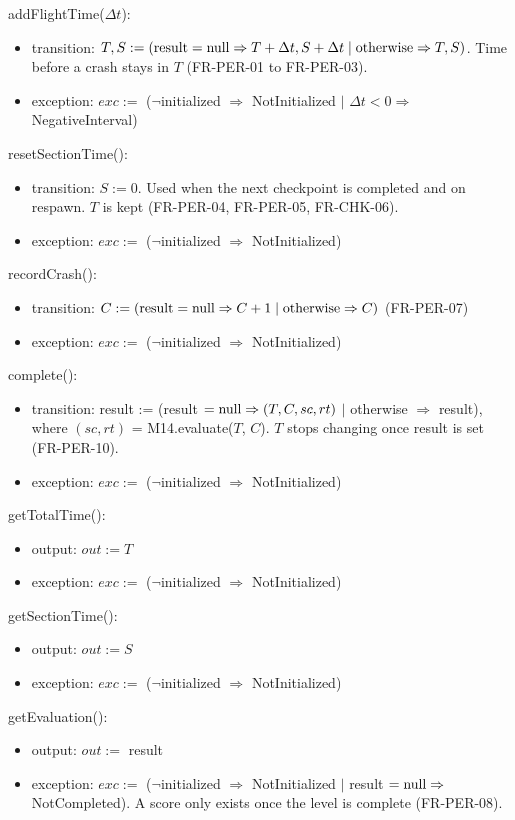 \documentclass[12pt, titlepage]{article}
\newcommand{\nul}{\textnormal{null}}
\newcommand{\noinit}{$\neg$initialized $\Rightarrow$ NotInitialized}
\begin{document}
\noindent addFlightTime($\Delta t$):
\begin{itemize}
\item transition: $T, S := (\text{result} = \nul \Rightarrow T + \Delta t,
  S + \Delta t \;|\; \text{otherwise} \Rightarrow T, S)$. Time before a crash
  stays in $T$ (FR-PER-01 to FR-PER-03).
\item exception: $exc :=$ (\noinit{} $|$ $\Delta t < 0 \Rightarrow$
  NegativeInterval)
\end{itemize}

\noindent resetSectionTime():
\begin{itemize}
\item transition: $S := 0$. Used when the next checkpoint is completed and on
  respawn. $T$ is kept (FR-PER-04, FR-PER-05, FR-CHK-06).
\item exception: $exc :=$ (\noinit)
\end{itemize}

\noindent recordCrash():
\begin{itemize}
\item transition: $C := (\text{result} = \nul \Rightarrow C + 1 \;|\;
  \text{otherwise} \Rightarrow C)$ (FR-PER-07)
\item exception: $exc :=$ (\noinit)
\end{itemize}

\noindent complete():
\begin{itemize}
\item transition: result := (result $= \nul \Rightarrow (T, C, sc, rt)$ $|$
  otherwise $\Rightarrow$ result), where $(sc, rt)$ = M14.evaluate($T$, $C$).
  $T$ stops changing once result is set (FR-PER-10).
\item exception: $exc :=$ (\noinit)
\end{itemize}

\noindent getTotalTime():
\begin{itemize}
\item output: $out := T$
\item exception: $exc :=$ (\noinit)
\end{itemize}

\noindent getSectionTime():
\begin{itemize}
\item output: $out := S$
\item exception: $exc :=$ (\noinit)
\end{itemize}

\noindent getEvaluation():
\begin{itemize}
\item output: $out :=$ result
\item exception: $exc :=$ (\noinit{} $|$ result $= \nul \Rightarrow$
  NotCompleted). A score only exists once the level is complete (FR-PER-08).
\end{itemize}
\end{document}
